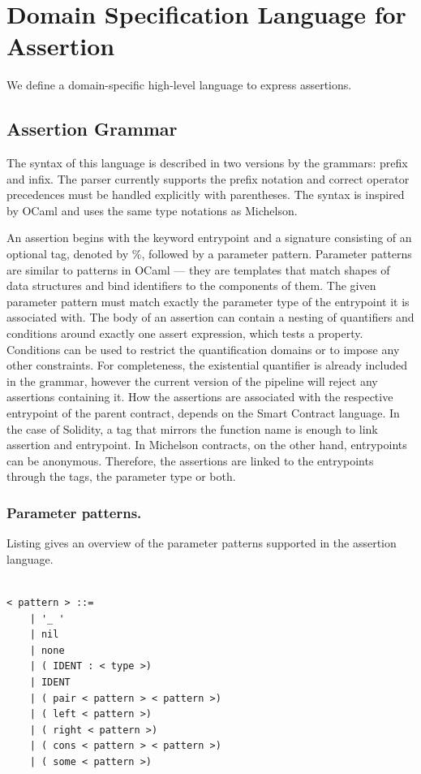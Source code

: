 \documentclass[runningheads]{llncs}
\begin{document}
\section{Domain Specification Language for Assertion}
We define a domain-specific high-level
language to express assertions.
\subsection{Assertion Grammar}
The syntax of this language is described in two versions by the grammars: prefix and infix. The parser currently supports the prefix notation and correct
operator precedences must be handled explicitly with parentheses. The syntax is inspired by OCaml and uses the same type notations as Michelson.

An assertion begins with the keyword entrypoint and a signature consisting of an optional tag, denoted by \%, followed by a parameter pattern. Parameter patterns are similar to patterns in OCaml — they are templates that match shapes of data structures and bind identifiers to the components of them. The given parameter pattern must match exactly the parameter type of the entrypoint it is associated with. The body of an assertion can
contain a nesting of quantifiers and conditions around exactly one assert expression, which tests a property. Conditions can be used to restrict the
quantification domains or to impose any other constraints. For completeness,
the existential quantifier is already included in the grammar, however the
current version of the pipeline will reject any assertions containing it.
How the assertions are associated with the respective entrypoint of the
parent contract, depends on the Smart Contract language. In the case of
Solidity, a tag that mirrors the function name is enough to link assertion and
entrypoint. In Michelson contracts, on the other hand, entrypoints can be
anonymous. Therefore, the assertions are linked to the entrypoints through
the tags, the parameter type or both. 

\subsubsection{Parameter patterns.}
Listing gives an overview of the parameter patterns supported in the assertion language.
\begin{lstlisting}[numbers=none]

< pattern > ::=
	| '_ '
	| nil
	| none
	| ( IDENT : < type >)
	| IDENT
	| ( pair < pattern > < pattern >)
	| ( left < pattern >)
	| ( right < pattern >)
	| ( cons < pattern > < pattern >)
	| ( some < pattern >)
   
\end{lstlisting}
\end{document}
